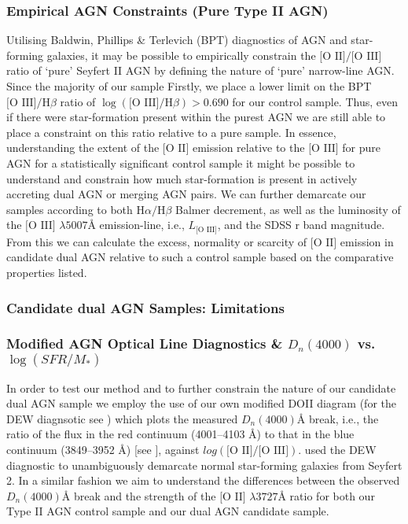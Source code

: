 \subsubsection{Empirical AGN Constraints (Pure Type II AGN)}

Utilising Baldwin, Phillips \& Terlevich (BPT) diagnostics of AGN and star-forming galaxies, it may be possible to empirically constrain the $\text{[O II]}/\text{[O III]}$ ratio of `pure' Seyfert II AGN by defining the nature of `pure' narrow-line AGN. Since the majority of our sample Firstly, we place a lower limit on the BPT $\text{[O III]}/\text{H}\beta$ ratio of $\log(\text{[O III]}/\text{H}\beta)>{0.690}$ for our control sample. Thus, even if there were star-formation present within the purest AGN we are still able to place a constraint on this ratio relative to a pure sample. In essence, understanding the extent of the $\text{[O II]}$ emission relative to the $\text{[O III]}$ for pure AGN for a statistically significant control sample it might be possible to understand and constrain how much star-formation is present in actively accreting dual AGN or merging AGN pairs. We can further demarcate our samples according to both $\text{H}\alpha/\text{H}\beta$ Balmer decrement, as well as the luminosity of the $\text{[O III]}$ $\lambda{5007}Å$ emission-line, i.e., $L_{\text{[O III]}}$, and the SDSS r band magnitude. From this we can calculate the excess, normality or scarcity of $\text{[O II]}$ emission in candidate dual AGN relative to such a control sample based on the comparative properties listed.

\subsubsection{Candidate dual AGN Samples: Limitations}
\subsubsection{Modified AGN Optical Line Diagnostics \& $D_{n}(4000)$ vs. $\log(SFR/M_{*})$}

In order to test our method and to further constrain the nature of our candidate dual AGN sample we employ the use of our own modified DOII diagram (for the DEW diagnsotic see \cite{Stasinska_2006}) which plots the measured $D_{n}(4000)Å$ break, i.e., the ratio of the flux in the red continuum (4001--4103 Å) to that in the blue continuum (3849--3952 Å) [see \cite{Balogh_1999}], against $log(\text{[O II]}/\text{[O III]})$. \cite{Marocco_2011} used the DEW diagnostic to unambiguously demarcate normal star-forming galaxies from Seyfert 2. In a similar fashion we aim to understand the differences between the observed $D_{n}(4000)Å$ break and the strength of the $\text{[O II]}$ $\lambda{3727}Å$ ratio for both our Type II AGN control sample and our dual AGN candidate sample.